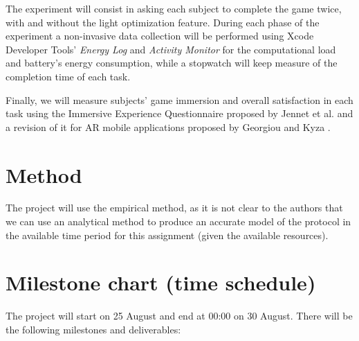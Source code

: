 \documentclass[12pt,twoside,english]{article}
\begin{document}
The experiment will consist in asking each subject to complete the game twice, with and without the light optimization feature. During each phase of the experiment a non-invasive data collection will be performed using Xcode Developer Tools' \emph{Energy Log} and \emph{Activity Monitor} for the computational load and battery's energy consumption, while a stopwatch will keep measure of the completion time of each task.

Finally, we will measure subjects' game immersion and overall satisfaction in each task using the Immersive Experience Questionnaire proposed by Jennet et al.\cite{jennett_measuring_2008} and a revision of it for AR mobile applications proposed by Georgiou and Kyza \cite{georgiou_development_2017}.

\section{Method}
\label{sect:method}

The project will use the empirical method\cite{peter_bock_getting_2001}, as it is not clear to the authors that we can use an analytical method to produce an accurate model of the protocol in the available time period for this assignment (given the available resources).

\section{Milestone chart (time schedule)}
\label{sect:milestones}

The project will start on 25 August and end at 00:00 on 30 August. There will be the following milestones and deliverables:
\end{document}
